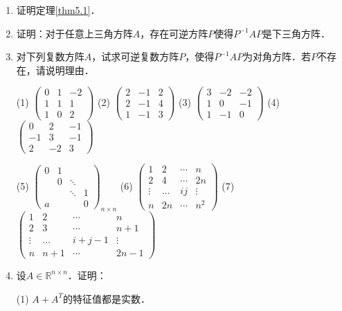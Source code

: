 \documentclass[a4paper,fontset=windows]{ctexbook}
\theoremstyle{definition}
\begin{document}
\begin{enumerate}
\item 证明定理\ref{thm5.1}．

\item 证明：对于任意上三角方阵$A$，存在可逆方阵$P$使得$P^{-1}AP$是下三角方阵．

\item 对下列复数方阵$A$，试求可逆复数方阵$P$，使得$P^{-1}AP$为对角方阵．若$P$不存在，请说明理由．

(1) $\begin{pmatrix}0&1&-2 \\ 1&1&1 \\ 1&0&2\end{pmatrix}$ \qquad
(2) $\begin{pmatrix}2&-1&2 \\ 2&-1&4 \\ 1&-1&3\end{pmatrix}$ \qquad
(3) $\begin{pmatrix}3&-2&-2 \\ 1&0&-1 \\ 1&-1&0\end{pmatrix}$ \qquad
(4) $\begin{pmatrix}0&2&-1 \\ -1&3&-1 \\ 2&-2&3\end{pmatrix}$

(5) $\begin{pmatrix}0&1&& \\ &0&\ddots& \\ &&\ddots&1 \\a&&&0\end{pmatrix}_{n\times n}$ \quad
(6) $\begin{pmatrix}1&2&\cdots&n \\ 2&4&\cdots&2n \\ \vdots&\dots&ij&\vdots \\ n&2n&\cdots&n^2\end{pmatrix}$ \qquad
(7) $\begin{pmatrix}1&2&\cdots&n \\ 2&3&\cdots&n+1 \\ \vdots&\dots&i+j-1&\vdots \\ n&n+1&\cdots&2n-1\end{pmatrix}$

\item 设$A\in\mathbb{R}^{n\times n}$．证明：

(1) $A+A^T$的特征值都是实数．


\end{enumerate}
\end{document}
